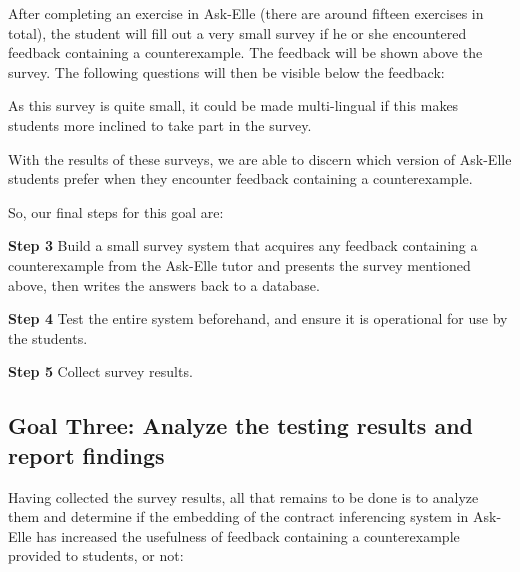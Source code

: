 \documentclass[10pt]{report}
\begin{document}
After completing an exercise in Ask-Elle (there are around fifteen exercises in total), the student will fill out a very small survey if he or she encountered feedback containing a counterexample.
The feedback will be shown above the survey.
The following questions will then be visible below the feedback:


As this survey is quite small, it could be made multi-lingual if this makes students more inclined to take part in the survey.

With the results of these surveys, we are able to discern which version of Ask-Elle students prefer when they encounter feedback containing a counterexample.

So, our final steps for this goal are:

\begin{description}
	\item{\textbf{Step 3}} Build a small survey system that acquires any feedback containing a counterexample from the Ask-Elle tutor and presents the survey mentioned above, then writes the answers back to a database.
	\item{\textbf{Step 4}} Test the entire system beforehand, and ensure it is operational for use by the students.
	\item{\textbf{Step 5}} Collect survey results.
\end{description}

\subsection{Goal Three: Analyze the testing results and report findings}

Having collected the survey results, all that remains to be done is to analyze them and determine if the embedding of the contract inferencing system in Ask-Elle has increased the usefulness of feedback containing a counterexample provided to students, or not:
\end{document}
